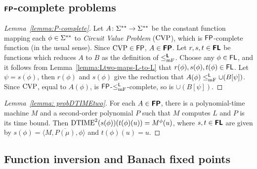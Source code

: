 \documentclass[envcountsect,envcountsame,orivec,oribibl]{llncs}
\begin{document}
\subsection{$\text{\bfseries \sffamily \upshape FP}$-complete problems}

\begin{proof}[Lemma~\ref{lemma:P-complete}]
Let $A \colon \Sigma ^{**} \to \Sigma ^{**}$ be the constant function mapping each $\phi \in \Sigma ^{**}$ to \emph{Circuit Value Problem} ($\mathrm{CVP}$), which is $\mathsf{FP}$-complete function (in the usual sense).
Since $\mathrm{CVP} \in \mathsf{FP}$, $A \in \text{\bfseries \sffamily \upshape FP}$.
Let $r, s, t \in \text{\bfseries \sffamily \upshape FL}$ be functions which reduces $A$ to $B$
as the definition of $\leq _{\mathrm{mF}} ^{\text{\bfseries \sffamily \upshape L}}$.
Choose any $\phi \in \mathsf{FL}$, and it follows from Lemma~\ref{lemma:Ltwo-maps-L-to-L}
that $r(\phi), s(\phi), t(\phi) \in \mathsf{FL}$.
Let $\psi = s(\phi)$, then $r(\phi)$ and $s(\phi)$ give the reduction that
$A(\phi) \leq _{\mathrm{mF}}^{\mathsf{L}} \cup (B[\psi])$.
Since $\mathrm{CVP}$, equal to $A(\phi)$, is $\mathsf{FP}$-$\leq _{\mathrm{mF}}^{\mathsf{L}}$-complete,
so is $\cup (B[\psi])$.
\end{proof}

\begin{proof}[Lemma~\ref{lemma: probDTIMEtwo}]
 For each $A \in \text{\bfseries \sffamily \upshape FP}$, 
 there is a polynomial-time machine $M$ 
 and a second-order polynomial $P$ 
 such that $M$ computes $L$ and $P$ is its time bound. 
 Then $\mathrm{DTIME}^2(s(\phi))(t(\phi)(u)) = M^\phi (u)$, 
 where 
 $s, t \in \text{\bfseries \sffamily \upshape FL}$ are given by 
 $s(\phi) = \langle M, \overline{P(\mu)}, \phi \rangle$ and 
 $t(\phi)(u) = u$.
\end{proof}

\subsection{Function inversion and Banach fixed points}
\end{document}
